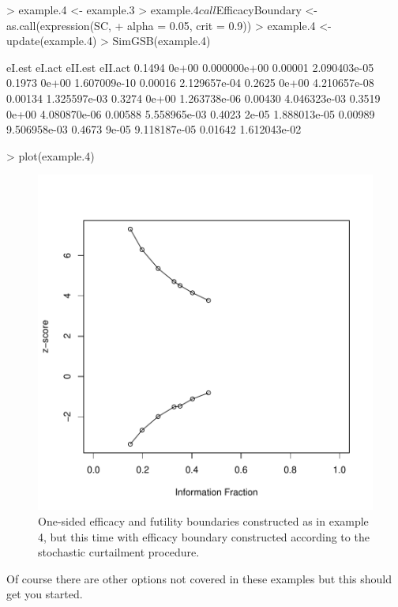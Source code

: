 \documentclass{article}
\begin{document}
\begin{itemize}
{\begin{Schunk}
\begin{Sinput}
> example.4 <- example.3
> example.4$call$EfficacyBoundary <- as.call(expression(SC, 
+     alpha = 0.05, crit = 0.9))
> example.4 <- update(example.4)
> SimGSB(example.4)
\end{Sinput}
\begin{Soutput}
       eI.est       eI.act eII.est      eII.act
0.1494  0e+00 0.000000e+00 0.00001 2.090403e-05
0.1973  0e+00 1.607009e-10 0.00016 2.129657e-04
0.2625  0e+00 4.210657e-08 0.00134 1.325597e-03
0.3274  0e+00 1.263738e-06 0.00430 4.046323e-03
0.3519  0e+00 4.080870e-06 0.00588 5.558965e-03
0.4023  2e-05 1.888013e-05 0.00989 9.506958e-03
0.4673  9e-05 9.118187e-05 0.01642 1.612043e-02
\end{Soutput}
\end{Schunk}

\begin{Schunk}
\begin{Sinput}
> plot(example.4)
\end{Sinput}
\end{Schunk}

  \begin{figure}
  \begin{center}
\includegraphics{GrpSeqBnds-vignette-1-incl-ex4-plot}
  \end{center}
  \caption{One-sided efficacy and futility boundaries constructed as in example 4, but this time 
    with efficacy boundary constructed according to the stochastic curtailment procedure.}
  \label{fig:ex4}
  \end{figure}
  
  Of course there are other options not covered in these examples but this should get you
    started.
  }
  \end{itemize}
\end{document}
